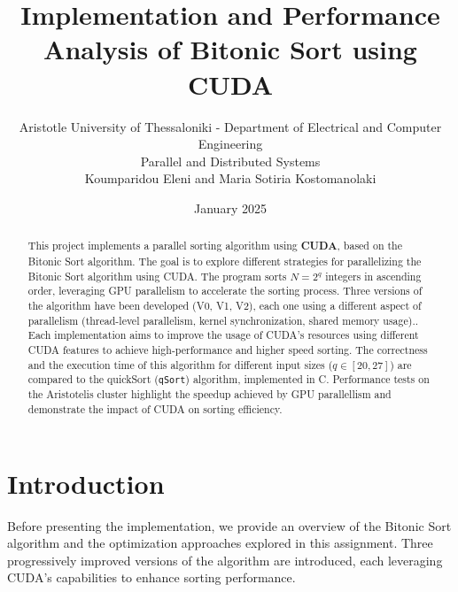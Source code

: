 \documentclass[a4paper,12pt]{article}
\title{Implementation and Performance Analysis of Bitonic Sort using CUDA}
\author{
    \small Aristotle University of Thessaloniki - Department of Electrical and Computer Engineering \\[0.5em]
    \small Parallel and Distributed Systems\\[1.5em]
    Koumparidou Eleni and Maria Sotiria Kostomanolaki \\[1em]
}
\date{January 2025}
\begin{document}
\maketitle

\begin{abstract}
This project implements a parallel sorting algorithm using \textbf{CUDA}, based on the Bitonic Sort algorithm. The goal is to explore different strategies for parallelizing the Bitonic Sort algorithm using CUDA. The program sorts $N = 2^q$ integers in ascending order, leveraging GPU parallelism to accelerate the sorting process. Three versions of the algorithm have been developed (V0, V1, V2), each one using a different aspect of parallelism (thread-level parallelism, kernel synchronization, shared memory usage).. Each implementation aims to improve the usage of CUDA's resources using different CUDA features to achieve high-performance and higher speed sorting. The correctness and the execution time of this algorithm for different input sizes ($q \in [20, 27]$) are compared to the quickSort (\texttt{qSort}) algorithm, implemented in C. Performance tests on the Aristotelis cluster highlight the speedup achieved by GPU parallellism and demonstrate the impact of CUDA on sorting efficiency.
\end{abstract}

\tableofcontents
\newpage

\section{Introduction}
Before presenting the implementation, we provide an overview of the Bitonic Sort algorithm and the optimization approaches explored in this assignment. Three progressively improved versions of the algorithm are introduced, each leveraging CUDA's capabilities to enhance sorting performance.
\end{document}
